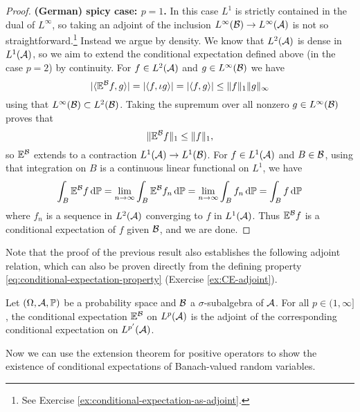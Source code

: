 \begin{proof}
  \textbf{(German) spicy case: $p = 1$.} In this case $L^1$ is strictly contained in the dual of $L^\infty$, so taking an adjoint of the inclusion $L^\infty(\mathcal{B}) \to L^\infty(\mathcal{A})$ is not so straightforward.\footnote{See Exercise \ref{ex:conditional-expectation-as-adjoint}.} 
  Instead we argue by density.
  We know that $L^2(\mathcal{A})$ is dense in $L^1(\mathcal{A})$, so we aim to extend the conditional expectation defined above (in the case $p=2$) by continuity.
  For $f \in L^2(\mathcal{A})$ and $g \in L^\infty(\mathcal{B})$ we have
  \begin{equation*}
    |\langle \mathbb{E}^{\mathcal{B}} f, g \rangle| = |\langle f, \iota g \rangle| = |\langle f, g \rangle| \leq \|f\|_1 \|g\|_\infty
  \end{equation*}
  using that $L^\infty(\mathcal{B}) \subset L^2(\mathcal{B})$.
  Taking the supremum over all nonzero $g \in L^\infty(\mathcal{B})$ proves that
  \begin{equation*}
    \|\mathbb{E}^{\mathcal{B}} f\|_1 \leq \|f\|_1,
  \end{equation*}
  so $\mathbb{E}^{\mathcal{B}}$ extends to a contraction $L^1(\mathcal{A}) \to L^1(\mathcal{B})$.
  For $f \in L^1(\mathcal{A})$ and $B \in \mathcal{B}$, using that integration on $B$ is a continuous linear functional on $L^1$, we have
  \begin{equation*}
    \int_B \mathbb{E}^{\mathcal{B}} f \, \mathrm{d}\mathbb{P}
    = \lim_{n \to \infty} \int_B \mathbb{E}^{\mathcal{B}} f_n \, \mathrm{d}\mathbb{P}
    = \lim_{n \to \infty} \int_B  f_n \, \mathrm{d}\mathbb{P}
    = \int_B f \, \mathrm{d}\mathbb{P}
  \end{equation*}
  where $f_n$ is a sequence in $L^2(\mathcal{A})$ converging to $f$ in $L^1(\mathcal{A})$.
  Thus $\mathbb{E}^{\mathcal{B}}f$ is a conditional expectation of $f$ given $\mathcal{B}$, and we are done.
\end{proof}

Note that the proof of the previous result also establishes the following adjoint relation, which can also be proven directly from the defining property \eqref{eq:conditional-expectation-property} (Exercise \ref{ex:CE-adjoint}).

\begin{prop}\label{prop:CE-adjoint}
  Let $(\Omega,\mathcal{A},\mathbb{P})$ be a probability space and $\mathcal{B}$ a $\sigma$-subalgebra of $\mathcal{A}$.
  For all $p \in (1,\infty]$, the conditional expectation $\mathbb{E}^{\mathcal{B}}$ on $L^p(\mathcal{A})$ is the adjoint of the corresponding conditional expectation on $L^{p'}(\mathcal{A})$.
\end{prop}

Now we can use the extension theorem for positive operators to show the existence of conditional expectations of Banach-valued random variables.

